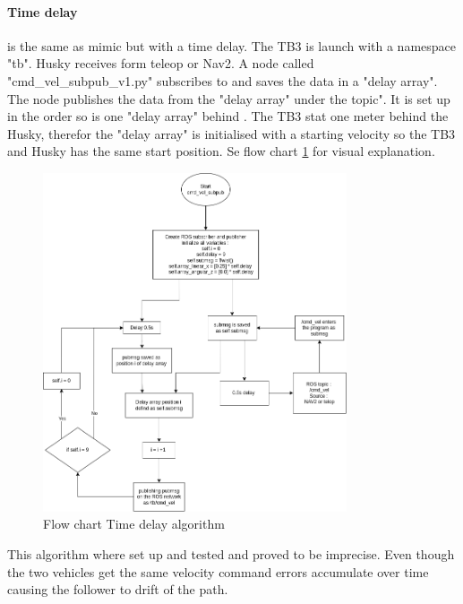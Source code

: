 \paragraph{Time delay} is the same as mimic but with a time delay. The TB3 is launch with a namespace "tb". Husky receives  form teleop or Nav2. A node called "cmd\_vel\_subpub\_v1.py" subscribes to  and saves the data in a "delay array". The node publishes the data from the "delay array" under the  topic". It is set up in the order so  is one "delay array" behind . The TB3 stat one meter behind the Husky, therefor the "delay array" is initialised with a starting velocity so the TB3 and Husky has the same start position. Se flow chart \ref{fig:TimeDelayFlow} for visual explanation.

\begin{figure}[H]
    \centering
    \includegraphics[width = 0.8\textwidth]{Figures/drawio/cmd_vel_subpub.png}
    \caption{Flow chart Time delay algorithm}
    \label{fig:TimeDelayFlow}
\end{figure}
This algorithm where set up and tested and proved to be imprecise. Even though the two vehicles get the same velocity command errors accumulate over time causing the follower to drift of the path. 

